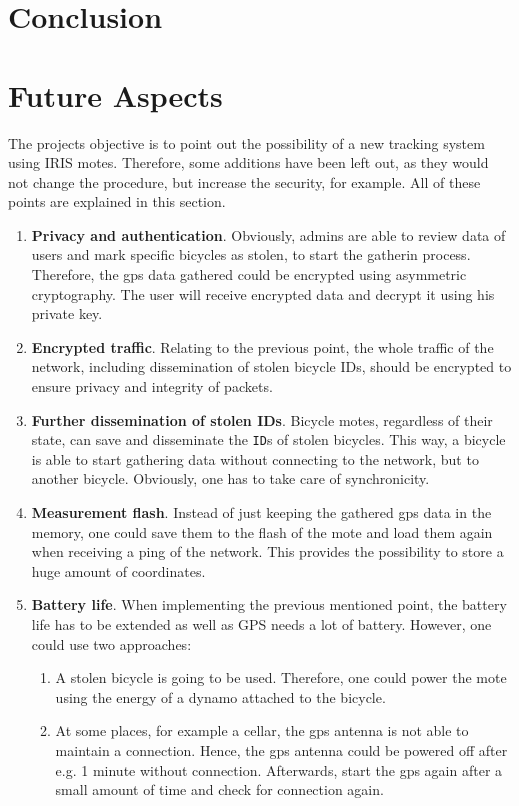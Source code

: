 \documentclass[a4paper]{article}
\begin{document}
\section{Conclusion}
\section{Future Aspects}
The projects objective is to point out the possibility of a new tracking system using IRIS motes. Therefore, some additions have been left out, as they would not change the procedure, but increase the security, for example. All of these points are explained in this section.
\begin{enumerate}
\item \textbf{Privacy and authentication}. Obviously, admins are able to review data of users and mark specific bicycles as stolen, to start the gatherin process. Therefore, the gps data gathered could be encrypted using asymmetric cryptography. The user will receive encrypted data and decrypt it using his private key.
\item \textbf{Encrypted traffic}. Relating to the previous point, the whole traffic of the network, including dissemination of stolen bicycle IDs, should be encrypted to ensure privacy and integrity of packets.
\item \textbf{Further dissemination of stolen IDs}. Bicycle motes, regardless of their state, can save and disseminate the \texttt{ID}s of stolen bicycles. This way, a bicycle is able to start gathering data without connecting to the network, but to another bicycle. Obviously, one has to take care of synchronicity.
\item \textbf{Measurement flash}. Instead of just keeping the gathered gps data in the memory, one could save them to the flash of the mote and load them again when receiving a ping of the network. This provides the possibility to store a huge amount of coordinates.
\item \textbf{Battery life}. When implementing the previous mentioned point, the battery life has to be extended as well as GPS needs a lot of battery. However, one could use two approaches:
\begin{enumerate}
\item A stolen bicycle is going to be used. Therefore, one could power the mote using the energy of a dynamo attached to the bicycle.
\item At some places, for example a cellar, the gps antenna is not able to maintain a connection. Hence, the gps antenna could be powered off after e.g. 1 minute without connection. Afterwards, start the gps again after a small amount of time and check for connection again.

\end{enumerate}
\end{enumerate}
\end{document}
